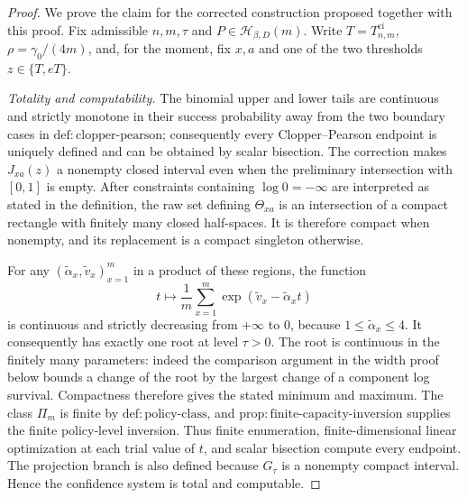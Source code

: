 \documentclass{article}
\begin{document}
\begin{proof}
We prove the claim for the corrected construction proposed together with this proof.  Fix admissible \(n,m,\tau\) and \(P\in\mathcal H_{\beta,D}(m)\).  Write \(T=T^{\mathrm{ci}}_{n,m}\), \(\rho=\gamma _0/(4m)\), and, for the moment, fix \(x,a\) and one of the two thresholds \(z\in\{T,eT\}\).

\emph{Totality and computability.}  The binomial upper and lower tails are continuous and strictly monotone in their success probability away from the two boundary cases in \(\mathrm{def{:}clopper\text{-}pearson}\); consequently every Clopper--Pearson endpoint is uniquely defined and can be obtained by scalar bisection.  The correction makes \(J_{xa}(z)\) a nonempty closed interval even when the preliminary intersection with \([0,1]\) is empty.  After constraints containing \(\log0=-\infty\) are interpreted as stated in the definition, the raw set defining \(\Theta_{xa}\) is an intersection of a compact rectangle with finitely many closed half-spaces.  It is therefore compact when nonempty, and its replacement is a compact singleton otherwise.

For any \((\widetilde\alpha_x,\widetilde v_x)_{x=1}^m\) in a product of these regions, the function
\[
 t\longmapsto \frac1m\sum_{x=1}^m
       \exp(\widetilde v_x-\widetilde\alpha_xt)
\]
is continuous and strictly decreasing from \(+\infty\) to \(0\), because \(1\leq\widetilde\alpha_x\leq4\).  It consequently has exactly one root at level \(\tau>0\).  The root is continuous in the finitely many parameters: indeed the comparison argument in the width proof below bounds a change of the root by the largest change of a component log survival.  Compactness therefore gives the stated minimum and maximum.  The class \(\Pi_m\) is finite by \(\mathrm{def{:}policy\text{-}class}\), and \(\mathrm{prop{:}finite\text{-}capacity\text{-}inversion}\) supplies the finite policy-level inversion.  Thus finite enumeration, finite-dimensional linear optimization at each trial value of \(t\), and scalar bisection compute every endpoint.  The projection branch is also defined because \(G_\tau\) is a nonempty compact interval.  Hence the confidence system is total and computable.


\end{proof}
\end{document}
